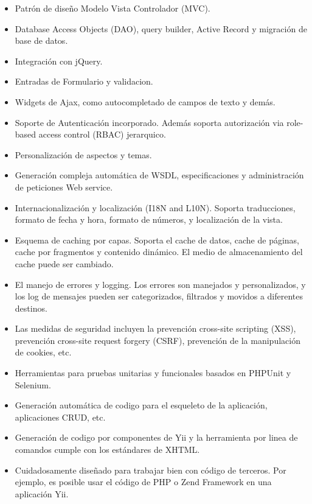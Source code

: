 \begin{itemize}

\item Patrón de diseño Modelo Vista Controlador (MVC).
\item Database Access Objects (DAO), query builder, Active Record y migración de base de datos.
\item Integración con jQuery.
\item Entradas de Formulario y validacion.
\item Widgets de Ajax, como autocompletado de campos de texto y demás.
\item Soporte de Autenticación incorporado. Además soporta autorización via role-based access control (RBAC) jerarquico.
\item Personalización de aspectos y temas.
\item Generación compleja automática de WSDL, especificaciones y administración de peticiones Web service.
\item Internacionalización y localización (I18N and L10N). Soporta traducciones, formato de fecha y hora, formato de números, y localización de la vista.
\item Esquema de caching por capas. Soporta el cache de datos, cache de páginas, cache por fragmentos y contenido dinámico. El medio de almacenamiento del cache puede ser cambiado.
\item El manejo de errores y logging. Los errores son manejados y personalizados, y los log de mensajes pueden ser categorizados, filtrados y movidos a diferentes destinos.
\item Las medidas de seguridad incluyen la prevención cross-site scripting (XSS), prevención cross-site request forgery (CSRF), prevención de la manipulación de cookies, etc.
\item Herramientas para pruebas unitarias y funcionales basados en PHPUnit y Selenium.
\item Generación automática de codigo para el esqueleto de la aplicación, aplicaciones CRUD, etc.
\item Generación de codigo por componentes de Yii y la herramienta por linea de comandos cumple con los estándares de XHTML.
\item Cuidadosamente diseñado para trabajar bien con código de terceros. Por ejemplo, es posible usar el código de PHP o Zend Framework en una aplicación Yii.

\end{itemize}

 \newpage

